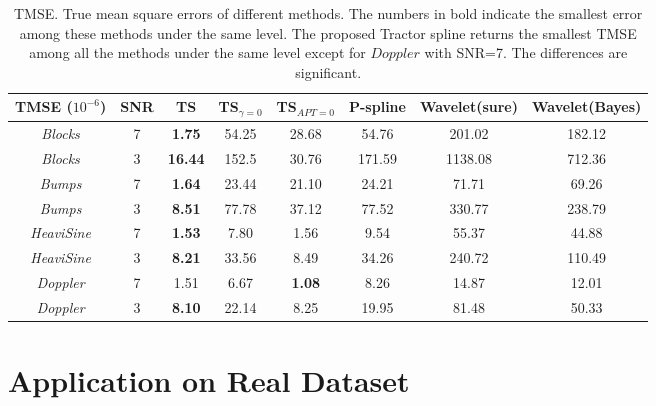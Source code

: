 \begin{table}
	\centering
	\caption{TMSE. True mean square errors of different methods. The numbers in bold indicate the smallest error among these methods under the same level. The proposed Tractor spline returns the smallest TMSE among all the methods under the same level except for $\textit{Doppler}$ with SNR=7. The differences are significant. }\label{tmse3200}
	\setlength\tabcolsep{1.5pt}
	\begin{tabular}{|c|c| c| c| c|c|c|c|}
\hline	TMSE ($10^{-6}$)  & SNR & TS & TS$_{\gamma=0}$ & TS$_{APT=0}$  & P-spline & Wavelet(sure) & Wavelet(Bayes)\\ \hline
		\textit{Blocks}    & 7   & \textbf{1.75} & 54.25 &  28.68   & 54.76   & 201.02   & 182.12   \\ \hline
		\textit{Blocks}    & 3   & \textbf{16.44} & 152.5 & 30.76  & 171.59   & 1138.08  & 712.36  \\ \hline
		\textit{Bumps}     & 7  & \textbf{1.64} & 23.44  & 21.10     & 24.21 & 71.71 & 69.26 \\ \hline
		\textit{Bumps}     & 3  & \textbf{8.51} & 77.78  &37.12     & 77.52 & 330.77 & 238.79 \\ \hline
		\textit{HeaviSine} & 7 & \textbf{1.53}& 7.80  & 1.56     & 9.54   & 55.37  &44.88  \\ \hline
		\textit{HeaviSine} & 3 & \textbf{8.21}& 33.56  & 8.49 & 34.26 & 240.72& 110.49\\ \hline
		\textit{Doppler}   & 7   & 1.51& 6.67  & \textbf{1.08}   &  8.26   & 14.87  & 12.01  \\ \hline
		\textit{Doppler}   & 3   & \textbf{8.10} & 22.14  & 8.25   & 19.95    &81.48  &50.33   \\ \hline
	\end{tabular}	
\end{table}


\clearpage 

\section{Application on Real Dataset}\label{splineapplication}

